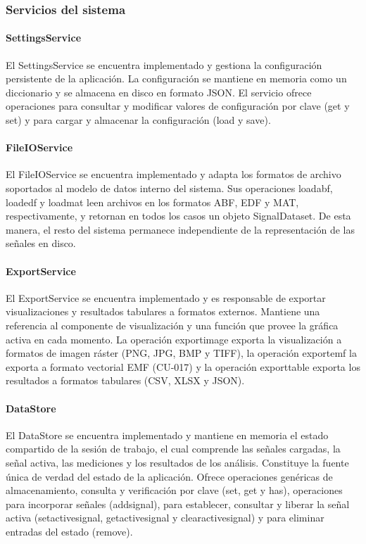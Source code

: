 \documentclass[11pt,a4paper]{article}
\DeclareRobustCommand{\_}{\textunderscore\allowbreak}
\begin{document}
\subsubsection{Servicios del sistema}

\paragraph{SettingsService}
El SettingsService se encuentra implementado y gestiona la configuración persistente de la aplicación. La configuración se mantiene en memoria como un diccionario y se almacena en disco en formato JSON. El servicio ofrece operaciones para consultar y modificar valores de configuración por clave (get y set) y para cargar y almacenar la configuración (load y save).

\paragraph{FileIOService}
El FileIOService se encuentra implementado y adapta los formatos de archivo soportados al modelo de datos interno del sistema. Sus operaciones load\_abf, load\_edf y load\_mat leen archivos en los formatos ABF, EDF y MAT, respectivamente, y retornan en todos los casos un objeto SignalDataset. De esta manera, el resto del sistema permanece independiente de la representación de las señales en disco.

\paragraph{ExportService}
El ExportService se encuentra implementado y es responsable de exportar visualizaciones y resultados tabulares a formatos externos. Mantiene una referencia al componente de visualización y una función que provee la gráfica activa en cada momento. La operación export\_image exporta la visualización a formatos de imagen ráster (PNG, JPG, BMP y TIFF), la operación export\_emf la exporta a formato vectorial EMF (CU-017) y la operación export\_table exporta los resultados a formatos tabulares (CSV, XLSX y JSON).

\paragraph{DataStore}
El DataStore se encuentra implementado y mantiene en memoria el estado compartido de la sesión de trabajo, el cual comprende las señales cargadas, la señal activa, las mediciones y los resultados de los análisis. Constituye la fuente única de verdad del estado de la aplicación. Ofrece operaciones genéricas de almacenamiento, consulta y verificación por clave (set, get y has), operaciones para incorporar señales (add\_signal), para establecer, consultar y liberar la señal activa (set\_active\_signal, get\_active\_signal y clear\_active\_signal) y para eliminar entradas del estado (remove).
\end{document}
